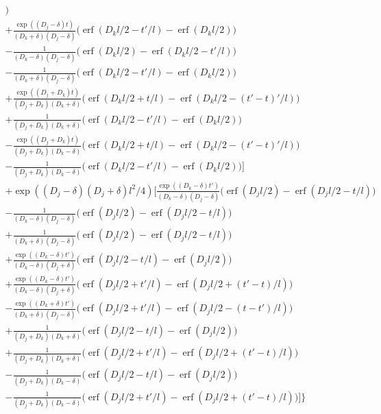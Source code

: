 \documentclass[a4paper]{article}
\newcommand{\erf}{\operatorname{erf}}
\begin{document}
\begin{multline}
  \bigg) \\
  + \frac{\exp((D_j-\delta) t)}{(D_k+\delta)(D_j-\delta)}
  \bigg(
  \erf(D_k l/2  - t'/l) - \erf(D_k l/2)
  \bigg) \\
  - \frac{1}{(D_k-\delta)(D_j-\delta)}
  \bigg(
  \erf(D_k l/2) - \erf(D_k l/2  - t'/l)
  \bigg) \\
  - \frac{1}{(D_k+\delta)(D_j-\delta)}
  \bigg(
  \erf(D_k l/2  - t'/l) - \erf(D_k l/2)
  \bigg) \\
  +
  \frac{\exp((D_j + D_k) t)}{(D_j + D_k)(D_k+\delta)}
  \bigg(
  \erf(D_k l/2 + t/l) - \erf(D_k l / 2 - (t'-t)'/l)
  \bigg) \\
  +
  \frac{1}{(D_j + D_k)(D_k+\delta)}
  \bigg(
  \erf(D_k l / 2 - t'/l) - \erf(D_k l / 2)
  \bigg) \\
  -
  \frac{\exp((D_j + D_k) t)}{(D_j + D_k)(D_k-\delta)}
  \bigg(
  \erf(D_k l/2 + t/l) - \erf(D_k l / 2 - (t'-t)'/l)
  \bigg) \\
  -
  \frac{1}{(D_j + D_k)(D_k-\delta)}
  \bigg(
  \erf(D_k l / 2 - t'/l) - \erf(D_k l / 2)
  \bigg)
  \bigg] \\
  +
  \exp((D_j - \delta)(D_j + \delta)l^2/4) \bigg[
  \frac{\exp((D_k-\delta) t')}{(D_k-\delta)(D_j - \delta)}
  \bigg(
  \erf(D_j l/2) - \erf(D_j l/2 - t/l) \bigg) \\
  -
  \frac{1}{(D_k-\delta)(D_j - \delta)}
  \bigg(
  \erf(D_j l/2) - \erf(D_j l/2 - t/l) \bigg) \\
  +
  \frac{1}{(D_k+\delta)(D_j - \delta)}
  \bigg(
  \erf(D_j l/2) - \erf(D_j l/2 - t/l) \bigg)
  \\
  +
  \frac{\exp((D_k-\delta) t')}{(D_k-\delta)(D_j+\delta)}
  \bigg(
  \erf(D_j l/2 - t/l) - \erf(D_j l/2)
  \bigg) \\
  +
  \frac{\exp((D_k-\delta) t')}{(D_k-\delta)(D_j+\delta)}
  \bigg(
  \erf(D_j l/2 + t'/l) - \erf(D_j l/2 + (t'-t)/l)
  \bigg) \\
  -
  \frac{\exp((D_k+\delta)t')}{(D_k+\delta)(D_j - \delta)} \bigg(
  \erf(D_j l/2 + t'/l) - \erf(D_j l/2 - (t-t')/l)
  \bigg) \\
  +
  \frac{1}{(D_j + D_k)(D_k+\delta)}
  \bigg(
  \erf(D_j l/2 - t/l) - \erf(D_j l/2)
  \bigg) \\
  + 
  \frac{1}{(D_j + D_k)(D_k+\delta)}
  \bigg(
  \erf(D_j l/2 + t'/l) - \erf(D_j l/2 + (t'-t)/l)
  \bigg) \\
  -
  \frac{1}{(D_j + D_k)(D_k-\delta)}
  \bigg(
  \erf(D_j l/2 - t/l) - \erf(D_j l/2)
  \bigg) \\
  -
  \frac{1}{(D_j + D_k)(D_k-\delta)}
  \bigg(
  \erf(D_j l/2 + t'/l) - \erf(D_j l/2 + (t'-t)/l)
  \bigg)
  \bigg]
  \bigg\} \\
\end{multline}
\end{document}
